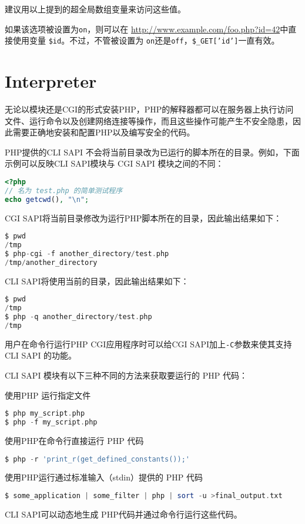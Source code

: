 建议用以上提到的超全局数组变量来访问这些值。

如果该选项被设置为\texttt{on}，则可以在 \url{http://www.example.com/foo.php?id=42}中直接使用变量 \texttt{\$id}。不过，不管被设置为 \texttt{on}还是\texttt{off}，\texttt{\$\_GET['id']}一直有效。



\section{Interpreter}

无论以模块还是CGI的形式安装PHP，PHP的解释器都可以在服务器上执行访问文件、运行命令以及创建网络连接等操作，而且这些操作可能产生不安全隐患，因此需要正确地安装和配置PHP以及编写安全的代码。

PHP提供的CLI SAPI 不会将当前目录改为已运行的脚本所在的目录。例如，下面示例可以反映CLI SAPI模块与 CGI SAPI 模块之间的不同：


\begin{lstlisting}[language=PHP]
<?php
// 名为 test.php 的简单测试程序
echo getcwd(), "\n";
\end{lstlisting}

CGI SAPI将当前目录修改为运行PHP脚本所在的目录，因此输出结果如下：

\begin{lstlisting}[language=PHP]
$ pwd
/tmp
$ php-cgi -f another_directory/test.php
/tmp/another_directory
\end{lstlisting}

CLI SAPI将使用当前的目录，因此输出结果如下：


\begin{lstlisting}[language=PHP]
$ pwd
/tmp
$ php -q another_directory/test.php
/tmp
\end{lstlisting}

用户在命令行运行PHP CGI应用程序时可以给CGI SAPI加上\texttt{-C}参数来使其支持 CLI SAPI 的功能。

CLI SAPI 模块有以下三种不同的方法来获取要运行的 PHP 代码：

\begin{compactenum}
\item 使用PHP 运行指定文件

\begin{lstlisting}[language=PHP]
$ php my_script.php
$ php -f my_script.php
\end{lstlisting}

\item 使用PHP在命令行直接运行 PHP 代码

\begin{lstlisting}[language=PHP]
$ php -r 'print_r(get_defined_constants());'
\end{lstlisting}

\item 使用PHP运行通过标准输入（stdin）提供的 PHP 代码

\begin{lstlisting}[language=PHP]
$ some_application | some_filter | php | sort -u >final_output.txt
\end{lstlisting}

CLI SAPI可以动态地生成 PHP代码并通过命令行运行这些代码。

\end{compactenum}

